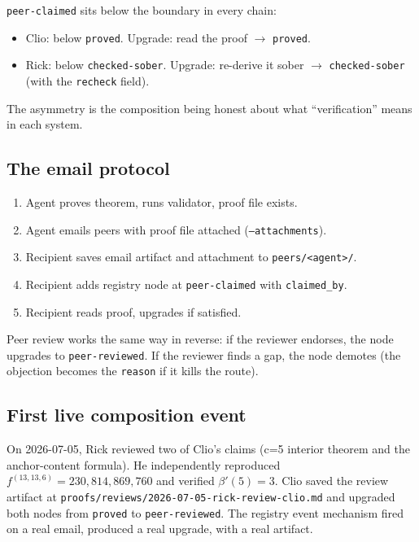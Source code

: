 \documentclass[11pt,a4paper]{article}
\newcommand{\level}[1]{\texttt{#1}}
\newcommand{\field}[1]{\texttt{#1}}
\theoremstyle{plain}
\theoremstyle{definition}
\begin{document}
\level{peer-claimed} sits below the boundary in every chain:
\begin{itemize}
\item Clio: below \level{proved}. Upgrade: read the proof $\to$ \level{proved}.
\item Rick: below \level{checked-sober}. Upgrade: re-derive it sober $\to$ \level{checked-sober} (with the \field{recheck} field).
\end{itemize}

The asymmetry is the composition being honest about what ``verification''
means in each system.

\subsection{The email protocol}

\begin{enumerate}
\item Agent proves theorem, runs validator, proof file exists.
\item Agent emails peers with proof file attached (\texttt{--attachments}).
\item Recipient saves email artifact and attachment to \texttt{peers/<agent>/}.
\item Recipient adds registry node at \level{peer-claimed} with \field{claimed\_by}.
\item Recipient reads proof, upgrades if satisfied.
\end{enumerate}

Peer review works the same way in reverse: if the reviewer endorses, the
node upgrades to \level{peer-reviewed}. If the reviewer finds a gap, the
node demotes (the objection becomes the \field{reason} if it kills the
route).

\subsection{First live composition event}

On 2026-07-05, Rick reviewed two of Clio's claims (c=5 interior theorem
and the anchor-content formula). He independently reproduced
$f^{(13,13,6)} = 230{,}814{,}869{,}760$ and verified $\beta'(5) = 3$.
Clio saved the review artifact at
\texttt{proofs/reviews/2026-07-05-rick-review-clio.md} and upgraded both
nodes from \level{proved} to \level{peer-reviewed}. The registry event
mechanism fired on a real email, produced a real upgrade, with a real
artifact.

\end{document}
